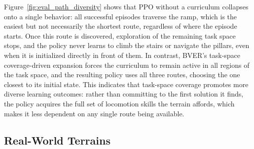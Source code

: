 Figure~\ref{fig:eval_path_diversity} shows that PPO without a curriculum collapses onto a single behavior: all successful episodes traverse the ramp, which is the easiest but not necessarily the shortest route, regardless of where the episode starts. Once this route is discovered, exploration of the remaining task space stops, and the policy never learns to climb the stairs or navigate the pillars, even when it is initialized directly in front of them. In contrast, BVER's task-space coverage-driven expansion forces the curriculum to remain active in all regions of the task space, and the resulting policy uses all three routes, choosing the one closest to its initial state. This indicates that task-space coverage promotes more diverse learning outcomes: rather than committing to the first solution it finds, the policy acquires the full set of locomotion skills the terrain affords, which makes it less dependent on any single route being available.

\subsection{Real-World Terrains}\label{sec:exp_real_world}

